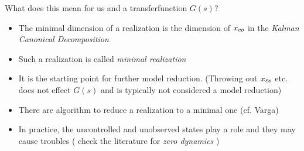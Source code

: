 What does this mean for us and a transferfunction $G(s)$?
\begin{itemize}
	\item The minimal dimension of a realization is the dimension of $x_{co}$ in the \emph{Kalman Canonical Decomposition}
	\item Such a realization is called \emph{minimal realization}
	\item It is the starting point for further model reduction. (Throwing out $x_{\bar c o}$ etc. does not effect $G(s)$ and is typically not considered a model reduction)
	\item There are algorithm to reduce a realization to a minimal one (cf. Varga)
	\item In practice, the uncontrolled and unobserved states play a role and they may cause troubles ( check the literature for \emph{zero dynamics} )
\end{itemize}
